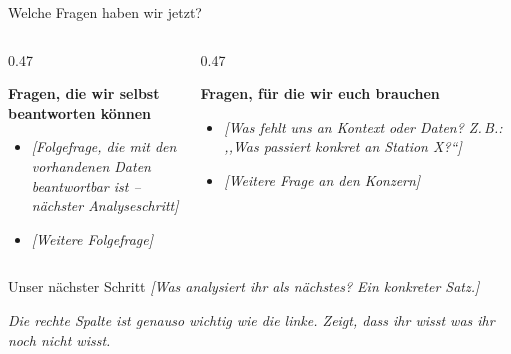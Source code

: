 \documentclass[aspectratio=169, 11pt]{beamer}
\newcommand{\hinweis}[1]{{\scriptsize\color{mutedtext}\textit{#1}}}
\begin{document}
\begin{frame}{Welche Fragen haben wir jetzt?}

  \begin{columns}[T, onlytextwidth]
    \begin{column}{0.47\textwidth}

      \textbf{Fragen, die wir selbst beantworten können}\\[6pt]
      \begin{itemize}
        \item \textit{[Folgefrage, die mit den vorhandenen Daten\\
          beantwortbar ist -- nächster Analyseschritt]}
        \item \textit{[Weitere Folgefrage]}
      \end{itemize}

    \end{column}

    \begin{column}{0.47\textwidth}

      \textbf{Fragen, für die wir euch brauchen}\\[6pt]
      \begin{itemize}
        \item \textit{[Was fehlt uns an Kontext oder Daten?
          Z.\,B.: ,,Was passiert konkret an Station X?``]}
        \item \textit{[Weitere Frage an den Konzern]}
      \end{itemize}

    \end{column}
  \end{columns}

  \vspace{14pt}

  \begin{block}{Unser nächster Schritt}
    \textit{[Was analysiert ihr als nächstes? Ein konkreter Satz.]}
  \end{block}

  \hinweis{Die rechte Spalte ist genauso wichtig wie die linke.
  Zeigt, dass ihr wisst was ihr noch nicht wisst.}

\end{frame}
\end{document}

